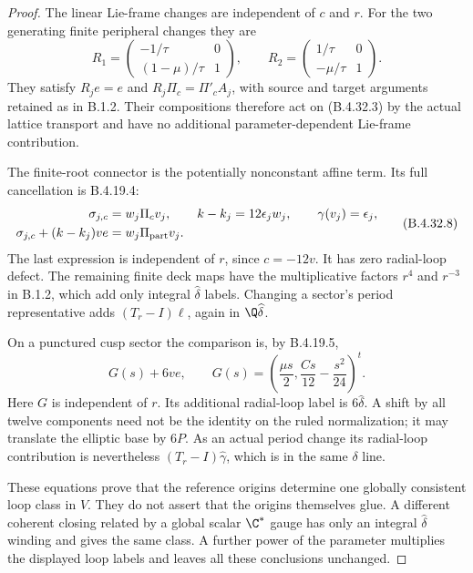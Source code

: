 \begin{proof}
The linear Lie-frame changes are independent of $c$ and $r$.
For the two generating finite peripheral changes they are
\[
 R_1=
 \begin{pmatrix}-1/\tau&0\\(1-\mu)/\tau&1\end{pmatrix},
 \qquad
 R_2=
 \begin{pmatrix}1/\tau&0\\-\mu/\tau&1\end{pmatrix}.
 \tag{B.4.32.7}
\]
They satisfy $R_je=e$ and $R_j\Pi_c=\Pi'_cA_j$, with
source and target arguments retained as in B.1.2. Their
compositions therefore act on (B.4.32.3) by the actual lattice
transport and have no additional parameter-dependent
Lie-frame contribution.

The finite-root connector is the potentially nonconstant
affine term. Its full cancellation is B.4.19.4:
\[
 \begin{split}
  \sigma_{j,c}&=w_j\Pi_c v_j,\qquad
   k-k_j=12\epsilon_jw_j,\qquad
   \gamma(v_j)=\epsilon_j,\\
  \sigma_{j,c}+(k-k_j)ve
     &=w_j\Pi_{\rm part}v_j .
 \end{split}
 \tag{B.4.32.8}
\]
The last expression is independent of $r$, since $c=-12v$.
It has zero radial-loop defect. The remaining finite deck
maps have the multiplicative factors $r^4$ and $r^{-3}$
in B.1.2, which add only integral $\widehat\delta$ labels.
Changing a sector's period representative adds
$(T_r-I)\ell$, again in $\Q\widehat\delta$.

On a punctured cusp sector the comparison is, by B.4.19.5,
\[
 G(s)+6ve,\qquad
 G(s)=\left(\frac{\mu s}{2},
                 \frac{Cs}{12}-\frac{s^2}{24}\right)^t .
 \tag{B.4.32.9}
\]
Here $G$ is independent of $r$. Its additional radial-loop
label is $6\widehat\delta$. A shift by all twelve components
need not be the identity on the ruled normalization; it may
translate the elliptic base by $6P$. As an actual period
change its radial-loop contribution is nevertheless
$(T_r-I)\widehat\gamma$, which is in the same $\delta$ line.

These equations prove that the reference origins determine one
globally consistent loop class in $V$. They do not assert that
the origins themselves glue. A different coherent closing
related by a global scalar $\C^*$ gauge has only an integral
$\widehat\delta$ winding and gives the same class. A further
power of the parameter multiplies the displayed loop labels
and leaves all these conclusions unchanged.


\end{proof}
